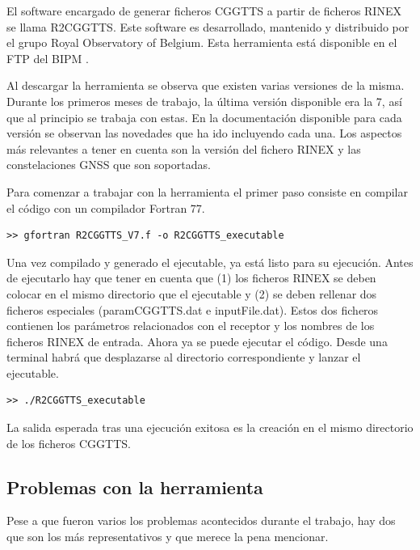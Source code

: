 El software encargado de generar ficheros CGGTTS a partir de ficheros RINEX se llama R2CGGTTS. Este software es desarrollado, mantenido y distribuido por el grupo Royal Observatory of Belgium. Esta herramienta está disponible en el FTP del BIPM \cite{ftpr2cggtts}. \newline

Al descargar la herramienta se observa que existen varias versiones de la misma. Durante los primeros meses de trabajo, la última versión disponible era la 7, así que al principio se trabaja con estas. En la documentación disponible para cada versión se observan las novedades que ha ido incluyendo cada una. Los aspectos más relevantes a tener en cuenta son la versión del fichero RINEX y las constelaciones GNSS que son soportadas. \newline

Para comenzar a trabajar con la herramienta el primer paso consiste en compilar el código con un compilador Fortran 77. 

\begin{lstlisting}
>> gfortran R2CGGTTS_V7.f -o R2CGGTTS_executable
\end{lstlisting}

Una vez compilado y generado el ejecutable, ya está listo para su ejecución. Antes de ejecutarlo hay que tener en cuenta que (1) los ficheros RINEX se deben colocar en el mismo directorio que el ejecutable y (2) se deben rellenar dos ficheros especiales (paramCGGTTS.dat e inputFile.dat). Estos dos ficheros contienen los parámetros relacionados con el receptor y los nombres de los ficheros RINEX de entrada. Ahora ya se puede ejecutar el código. Desde una terminal habrá que desplazarse al directorio correspondiente y lanzar el ejecutable.

\begin{lstlisting}
>> ./R2CGGTTS_executable
\end{lstlisting}

La salida esperada tras una ejecución exitosa es la creación en el mismo directorio de los ficheros CGGTTS.

\subsection{Problemas con la herramienta}
Pese a que fueron varios los problemas acontecidos durante el trabajo, hay dos que son los más representativos y que merece la pena mencionar.


